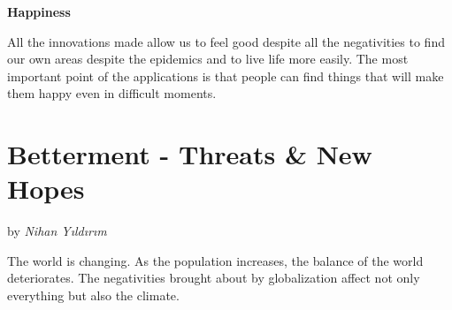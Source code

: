 \documentclass[]{book}
\begin{document}
\textbf{Happiness}

All the innovations made allow us to feel good despite all the negativities to find our own areas despite the epidemics and to live life more easily. The most important point of the applications is that people can find things that will make them happy even in difficult moments.

\hypertarget{betterment---threats-new-hopes}{%
\chapter{Betterment - Threats \& New Hopes}\label{betterment---threats-new-hopes}}

by \emph{Nihan Yıldırım}

The world is changing. As the population increases, the balance of the world deteriorates. The negativities brought about by globalization affect not only everything but also the climate.
\end{document}

